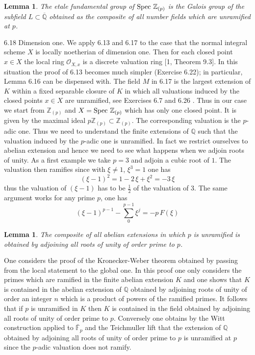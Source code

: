 \documentclass[letterpaper,11pt]{article}
\def\Spec{{\rm Spec\,}}
\def\F{{\mathbb F}}
\def\Q{{\mathbb Q}}
\def\Z{\mathbb{Z}}
\theoremstyle{plain}
\newtheorem{lem}[thm]{Lemma}
\begin{document}
\iffalse
\begin{lem}\label{fieldL} The etale fundamental group of $\Spec\,\Z_{(p)}$ is the Galois group of the subfield $L\subset \overline\Q$ obtained as the composite of all number fields which are unramified at $p$. 
\end{lem}
6.18 Dimension one. We apply 6.13 and 6.17 to the case that the normal integral scheme $X$ is locally noetherian of dimension one. Then for each closed point $x \in X$ the local ring $\mathcal{O}_{X, x}$ is a discrete valuation ring [1, Theorem 9.3]. In this situation the proof of 6.13 becomes much simpler (Exercise 6.22); in particular, Lemma 6.16 can be dispensed with. The field $M$ in 6.17 is the largest extension of $K$ within a fixed separable closure of $K$ in which all valuations induced by the closed points $x \in X$ are unramified, see Exercises 6.7 and 6.26 .\newline
Thus in our case we start from $\Z_{(p)}$ and $X=\Spec\,\Z_{(p)}$ which has only one closed point. It is given by the maximal ideal $p\Z_{(p)}\subset \Z_{(p)}$. The corresponding valuation is the $p$-adic one. Thus we need to understand the finite extensions of $\Q$ such that the valuation induced by the $p$-adic one is unramified. In fact we restrict ourselves to abelian extension and hence we need to see what happens when we adjoin roots of unity. \newline
As a first example we take $p=3$ and adjoin a cubic root of $1$. The valuation then ramifies since with $\xi\neq 1$, $\xi^3=1$ one has
$$
(\xi-1)^2=1-2\,\xi+\xi^2=-3\,\xi
$$
thus the valuation of $(\xi-1)$ has to be $\frac 12$ of the valuation of $3$. The same argument works for any prime $p$, one has 
$$
(\xi-1)^{p-1}-\sum_0^{p-1} \xi^j=-p\, F(\xi)
$$
\begin{lem} The composite of all abelian extensions in which $p$ is unramified is obtained by adjoining all roots of unity of order prime to $p$. 
\end{lem}
\proof One considers the proof of the Kronecker-Weber theorem obtained by passing from the local statement to the global one. In this proof one only considers the primes which are ramified in the finite abelian extension $K$ and one shows that $K$ is contained in the abelian extension of $\Q$ obtained by adjoining roots of unity of order an integer $n$ which is a product of powers of the ramified primes. It follows that if $p$ is unramified in $K$ then $K$ is contained in the field obtained by adjoining all roots of unity of order prime to $p$. Conversely one obtains by the Witt construction applied to $\bar \F_p$ and the Teichmuller lift that the extension of $\Q$ obtained by adjoining all roots of unity of order prime to $p$ is unramified at $p$ since the $p$-adic valuation does not ramify.\endproof
\end{document}

